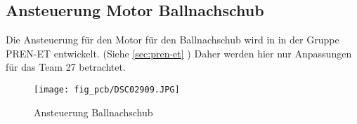 \subsection{Ansteuerung Motor Ballnachschub}
\label{sec:dc}
Die Ansteuerung für den Motor für den Ballnachschub wird in in der Gruppe 
PREN-ET entwickelt. (Siehe \ref{sec:pren-et} )
Daher werden hier nur Anpassungen für das Team 27 betrachtet. 
\begin{figure}[h!]
    \centering
    \texttt{[image: fig\_pcb/DSC02909.JPG]}
    \caption{Ansteuerung Ballnachschub}
    \label{fig:dc}
\end{figure}
